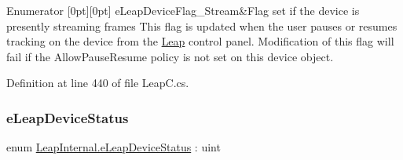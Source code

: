\begin{DoxyEnumFields}{Enumerator}
[0pt][0pt]{}\mbox{\label{namespace_leap_internal_ac070f7da620782f2faeb48f6b5774672a449e714ffc5a6a58fb1026e98b7ec8c0}} 
e\+Leap\+Device\+Flag\+\_\+\+Stream&Flag set if the device is presently streaming frames This flag is updated when the user pauses or resumes tracking on the device from the \mbox{\hyperlink{namespace_leap}{Leap}} control panel. Modification of this flag will fail if the Allow\+Pause\+Resume policy is not set on this device object. \\
\hline

\end{DoxyEnumFields}


Definition at line 440 of file Leap\+C.\+cs.

\mbox{\label{namespace_leap_internal_a16b28ea79f39b6205c514b3e9b075bed}} 
\subsubsection{\texorpdfstring{eLeapDeviceStatus}{eLeapDeviceStatus}}
{\footnotesize\ttfamily enum \mbox{\hyperlink{namespace_leap_internal_a16b28ea79f39b6205c514b3e9b075bed}{Leap\+Internal.\+e\+Leap\+Device\+Status}} \+: uint\hspace{0.3cm}{\ttfamily [strong]}}

